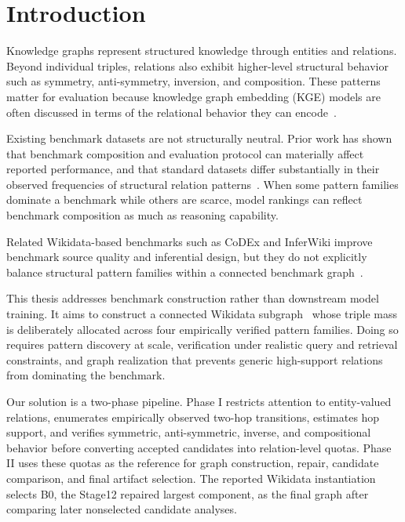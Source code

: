 \documentclass[12pt,a4paper]{article}
\begin{document}
\clearpage
\tableofcontents
\clearpage
\listoffigures
\clearpage
\listoftables
\clearpage

\section{Introduction}
Knowledge graphs represent structured knowledge through entities and relations. Beyond individual triples, relations also exhibit higher-level structural behavior such as symmetry, anti-symmetry, inversion, and composition. These patterns matter for evaluation because knowledge graph embedding (KGE) models are often discussed in terms of the relational behavior they can encode~\cite{sun2019rotate,ali2022bringing}.

Existing benchmark datasets are not structurally neutral. Prior work has shown that benchmark composition and evaluation protocol can materially affect reported performance, and that standard datasets differ substantially in their observed frequencies of structural relation patterns~\cite{sun2020reevaluation,ali2022bringing}. When some pattern families dominate a benchmark while others are scarce, model rankings can reflect benchmark composition as much as reasoning capability.

Related Wikidata-based benchmarks such as CoDEx and InferWiki improve benchmark source quality and inferential design, but they do not explicitly balance structural pattern families within a connected benchmark graph~\cite{safavi2020codex,cao2021inferwiki}.

This thesis addresses benchmark construction rather than downstream model training. It aims to construct a connected Wikidata subgraph~\cite{vrandecic2014wikidata} whose triple mass is deliberately allocated across four empirically verified pattern families. Doing so requires pattern discovery at scale, verification under realistic query and retrieval constraints, and graph realization that prevents generic high-support relations from dominating the benchmark.

Our solution is a two-phase pipeline. Phase I restricts attention to entity-valued relations, enumerates empirically observed two-hop transitions, estimates hop support, and verifies symmetric, anti-symmetric, inverse, and compositional behavior before converting accepted candidates into relation-level quotas. Phase II uses these quotas as the reference for graph construction, repair, candidate comparison, and final artifact selection. The reported Wikidata instantiation selects B0, the Stage12 repaired largest component, as the final graph after comparing later nonselected candidate analyses.
\end{document}
